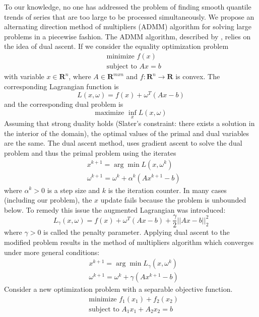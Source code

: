 \documentclass[12pt]{article}
\numberwithin{equation}{section}
\theoremstyle{plain}
\begin{document}
To our knowledge, no one has addressed the problem of finding smooth quantile trends of series that are too large to be processed simultaneously. We propose an alternating direction method of multipliers (ADMM) algorithm for solving large problems in a piecewise fashion. The ADMM algorithm, described by \cite{boyd2011distributed}, relies on the idea of dual ascent. If we consider the equality optimization problem 
\begin{align}
&\text{minimize } f(x)\\
&\text{subject to } Ax = b
\end{align}
with variable $x\in \mathbf{R}^n$, where $A \in \mathbf{R}^{mxn}$ and $f: \mathbf{R}^n \rightarrow \mathbf{R}$ is convex. The corresponding Lagrangian function is 
\begin{equation}
L(x,\omega) = f(x) + \omega^T(Ax-b)
\end{equation}
and the corresponding dual problem  is 
\begin{equation}
\text{maximize } \inf_x L(x,\omega)
\end{equation}
Assuming that strong duality holds (Slater's constraint: there exists a solution in the interior of the domain), the optimal values of the primal and dual variables are the same. The dual ascent method, uses gradient ascent to solve the dual problem and thus the primal problem using the iterates
\begin{align}
&x^{k+1} = \arg\min L(x, \omega^k)\\
&\omega^{k+1} = \omega^k + \alpha^k(Ax^{k+1} - b)
\end{align}
where $\alpha^k > 0$ is a step size and $k$ is the iteration counter. In many cases (including our problem), the $x$ update fails because the problem is unbounded below. To remedy this issue the augmented Lagrangian was introduced:
\begin{equation}
L_{\gamma}(x,\omega) = f(x)+\omega^T(Ax-b) + \frac{\gamma}{2}||Ax-b||_2^2
\end{equation}
where $\gamma > 0$ is called the penalty parameter. Applying dual ascent to the modified problem results in the method of multipliers algorithm which converges under more general conditions:
\begin{align}
&x^{k+1} = \arg\min L_\gamma(x, \omega^k)\\
&\omega^{k+1} = \omega^k + \gamma(Ax^{k+1} - b)
\end{align}
Consider a new optimization problem with a separable objective function. 
\begin{align}
&\text{minimize } f_1(x_1) + f_2(x_2)\\
&\text{subject to } A_1x_1 + A_2x_2 = b
\end{align}
\end{document}

